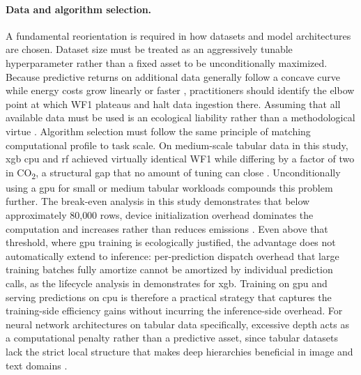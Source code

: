 \paragraph{Data and algorithm selection.}
A fundamental reorientation is required in how datasets and model architectures are chosen. Dataset size must be treated as an aggressively tunable hyperparameter rather than a fixed asset to be unconditionally maximized. Because predictive returns on additional data generally follow a concave curve while energy costs grow linearly or faster \cite{koshuteRecommendingTrainingSet2021}, practitioners should identify the elbow point at which WF1 plateaus and halt data ingestion there. Assuming that all available data must be used is an ecological liability rather than a methodological virtue \cite{verdecchiaDataCentricGreenAI2022a}. Algorithm selection must follow the same principle of matching computational profile to task scale. On medium-scale tabular data in this study, \gls{xgb} \gls{cpu} and \gls{rf} achieved virtually identical WF1 while differing by a factor of two in CO\textsubscript{2}, a structural gap that no amount of tuning can close \cite{schwartzGreenAI2020}. Unconditionally using a \gls{gpu} for small or medium tabular workloads compounds this problem further. The break-even analysis in this study demonstrates that below approximately 80{,}000 rows, device initialization overhead dominates the computation and increases rather than reduces emissions \cite{wuSustainableAIEnvironmental2022}. Even above that threshold, where \gls{gpu} training is ecologically justified, the advantage does not automatically extend to inference: per-prediction dispatch overhead that large training batches fully amortize cannot be amortized by individual prediction calls, as the lifecycle analysis in  demonstrates for \gls{xgb}. Training on \gls{gpu} and serving predictions on \gls{cpu} is therefore a practical strategy that captures the training-side efficiency gains without incurring the inference-side overhead. For neural network architectures on tabular data specifically, excessive depth acts as a computational penalty rather than a predictive asset, since tabular datasets lack the strict local structure that makes deep hierarchies beneficial in image and text domains \cite{grinsztajnWhyTreebasedModels2022a}.

